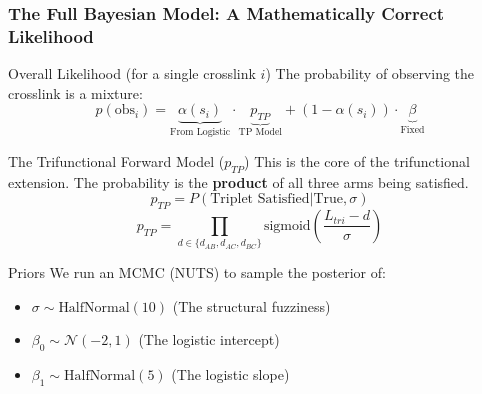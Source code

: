 \documentclass[a4paper,8pt]{beamer}
\begin{document}
\begin{frame}
\frametitle{The Full Bayesian Model: A Mathematically Correct Likelihood}

    \begin{block}{Overall Likelihood (for a single crosslink $i$)}
        The probability of observing the crosslink is a mixture:
        \begin{equation*}
            p(\text{obs}_i) = \underbrace{\alpha(s_i)}_{\text{From Logistic}} \cdot \underbrace{p_{TP}}_{\text{TP Model}} + (1-\alpha(s_i)) \cdot \underbrace{\beta}_{\text{Fixed}}
        \end{equation*}
    \end{block}
    
    \begin{block}{The Trifunctional Forward Model ($p_{TP}$)}
        This is the core of the trifunctional extension. The probability
        is the \textbf{product} of all three arms being satisfied.
        \begin{equation*}
            p_{TP} = P(\text{Triplet Satisfied} | \text{True}, \sigma)
        \end{equation*}
        \begin{equation*}
            p_{TP} = \prod_{d \in \{d_{AB}, d_{AC}, d_{BC}\}} \text{sigmoid}\left(\frac{L_{tri} - d}{\sigma}\right)
        \end{equation*}
    \end{block}
    
    \begin{block}{Priors}
    We run an MCMC (NUTS) to sample the posterior of:
        \begin{itemize}
            \item $\sigma \sim \text{HalfNormal}(10)$ \quad (The structural fuzziness)
            \item $\beta_0 \sim \mathcal{N}(-2, 1)$ \quad (The logistic intercept)
            \item $\beta_1 \sim \text{HalfNormal}(5)$ \quad (The logistic slope)
        \end{itemize}
    \end{block}
    
\end{frame}
\end{document}
